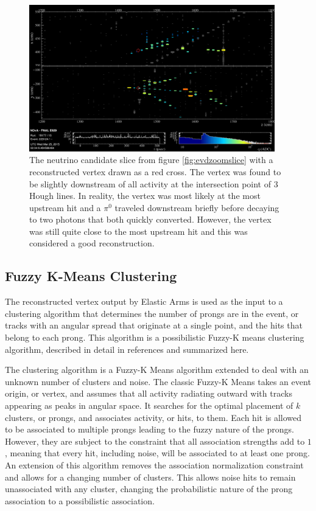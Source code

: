 \begin{figure}[htb]
  \centering
  \includegraphics[width=0.95\textwidth]{figures/evd/ZoomVtx.png}
  \caption[An Example Neutrino Candidate Slice with a Reconstructed Vertex]{The neutrino candidate slice from figure \ref{fig:evdzoomslice} with a reconstructed vertex drawn as a red cross. The vertex was found to be slightly downstream of all activity at the intersection point of $3$ Hough lines. In reality, the vertex was most likely at the most upstream hit and a $\pi^0$ traveled downstream briefly before decaying to two photons that both quickly converted. However, the vertex was still quite close to the most upstream hit and this was considered a good reconstruction.}
  \label{fig:evdVtx}
\end{figure}

\subsection{Fuzzy K-Means Clustering}
\label{sec:RecoFuzzyK}

The reconstructed vertex output by Elastic Arms is used as the input to a clustering algorithm that determines the number of prongs are in the event, or tracks with an angular spread that originate at a single point, and the hits that belong to each prong. This algorithm is a possibilistic Fuzzy-K means clustering algorithm, described in detail in references \cite{ref:TNFuzzyK, ref:ThesisEvan} and summarized here.

The clustering algorithm is a Fuzzy-K Means algorithm extended to deal with an unknown number of clusters and noise. The classic Fuzzy-K Means \cite{ref:RecoFuzzy1, ref:RecoFuzzy2} takes an event origin, or vertex, and assumes that all activity radiating outward with tracks appearing as peaks in angular space. It searches for the optimal placement of $k$ clusters, or prongs, and associates activity, or hits, to them. Each hit is allowed to be associated to multiple prongs leading to the fuzzy nature of the prongs. However, they are subject to the constraint that all association strengths add to $1$, meaning that every hit, including noise, will be associated to at least one prong. An extension of this algorithm \cite{ref:RecoFuzzyExt} removes the association normalization constraint and allows for a changing number of clusters. This allows noise hits to remain unassociated with any cluster, changing the probabilistic nature of the prong association to a possibilistic association.

